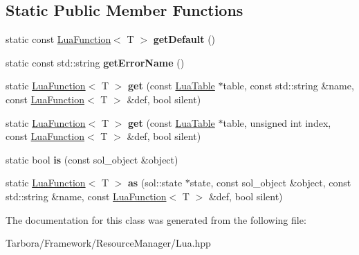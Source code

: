 \subsection*{Static Public Member Functions}
\begin{DoxyCompactItemize}
\item 
\mbox{\label{classTarbora_1_1LuaType_3_01LuaFunction_3_01T_01_4_01_4_a35d47501cfde0ab7ee29d8f98e830a58}} 
static const \hyperlink{classTarbora_1_1LuaFunction}{Lua\+Function}$<$ T $>$ {\bfseries get\+Default} ()
\item 
\mbox{\label{classTarbora_1_1LuaType_3_01LuaFunction_3_01T_01_4_01_4_a555a8479850443b09954f4cc1e558b1a}} 
static const std\+::string {\bfseries get\+Error\+Name} ()
\item 
\mbox{\label{classTarbora_1_1LuaType_3_01LuaFunction_3_01T_01_4_01_4_a95058d7995342cde9658d037fceed660}} 
static \hyperlink{classTarbora_1_1LuaFunction}{Lua\+Function}$<$ T $>$ {\bfseries get} (const \hyperlink{classTarbora_1_1LuaTable}{Lua\+Table} $\ast$table, const std\+::string \&name, const \hyperlink{classTarbora_1_1LuaFunction}{Lua\+Function}$<$ T $>$ \&def, bool silent)
\item 
\mbox{\label{classTarbora_1_1LuaType_3_01LuaFunction_3_01T_01_4_01_4_a011964f5c77b7b1da24deb4024d612be}} 
static \hyperlink{classTarbora_1_1LuaFunction}{Lua\+Function}$<$ T $>$ {\bfseries get} (const \hyperlink{classTarbora_1_1LuaTable}{Lua\+Table} $\ast$table, unsigned int index, const \hyperlink{classTarbora_1_1LuaFunction}{Lua\+Function}$<$ T $>$ \&def, bool silent)
\item 
\mbox{\label{classTarbora_1_1LuaType_3_01LuaFunction_3_01T_01_4_01_4_a97820cc9cd26d0b5cb2849ca813d66ca}} 
static bool {\bfseries is} (const sol\+\_\+object \&object)
\item 
\mbox{\label{classTarbora_1_1LuaType_3_01LuaFunction_3_01T_01_4_01_4_ac1b0445aa83315da78cf59bad0c596af}} 
static \hyperlink{classTarbora_1_1LuaFunction}{Lua\+Function}$<$ T $>$ {\bfseries as} (sol\+::state $\ast$state, const sol\+\_\+object \&object, const std\+::string \&name, const \hyperlink{classTarbora_1_1LuaFunction}{Lua\+Function}$<$ T $>$ \&def, bool silent)
\end{DoxyCompactItemize}


The documentation for this class was generated from the following file\+:\begin{DoxyCompactItemize}
\item 
Tarbora/\+Framework/\+Resource\+Manager/Lua.\+hpp\end{DoxyCompactItemize}
